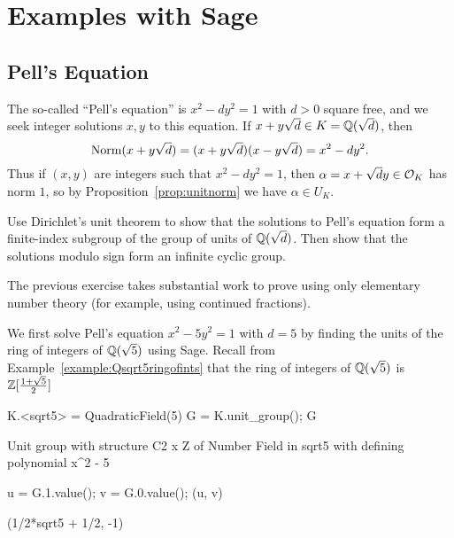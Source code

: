 \section{Examples with Sage}

\subsection{Pell's Equation}\label{sec:pell}

The so-called ``Pell's equation'' is $x^2-dy^2 = 1$ with $d>0$ square
free, and we seek integer solutions $x,y$ to this equation.
If $x+y\sqrt{d}\in K = \mathbb{Q}(\sqrt{d})$, then
$$
	\operatorname{Norm}(x+y\sqrt{d}) = (x+y\sqrt{d})(x-y\sqrt{d}) = x^2 -dy^2.
$$
Thus if $(x,y)$ are integers such that $x^2 - d y^2 = 1$, then $\alpha
= x + \sqrt{d}y \in \mathcal{O}_K$ has norm $1$, so by
Proposition~\ref{prop:unitnorm} we have $\alpha \in U_K$.

\begin{exercise}
	Use Dirichlet's unit theorem to show that the solutions to Pell's equation
	form a finite-index subgroup of the group of units of $\mathbb{Q}(\sqrt{d})$.
	Then show that the solutions modulo sign form an infinite cyclic group.
\end{exercise}

\begin{remark}
	The previous exercise takes substantial work to prove using only elementary
	number theory (for example, using continued fractions).
\end{remark}

We first solve Pell's equation $x^2 - 5y^2 = 1$ with $d=5$ by finding
the units of the ring of integers of $\mathbb{Q}(\sqrt{5})$ using Sage.
Recall from Example~\ref{example:Qsqrt5ringofints} that the
ring of integers of $\mathbb{Q}(\sqrt{5})$ is $\mathbb{Z}[\frac{1+\sqrt{5}}{2}]$

\begin{sagecode}
\begin{sagecell}
K.<sqrt5> = QuadraticField(5)
G = K.unit_group(); G
\end{sagecell}
\begin{sageout}
Unit group with structure C2 x Z of Number Field in sqrt5 with
defining polynomial x^2 - 5
\end{sageout}
\begin{sagecell}
u = G.1.value(); v = G.0.value(); (u, v)
\end{sagecell}
\begin{sageout}
(1/2*sqrt5 + 1/2, -1)
\end{sageout}
\end{sagecode} %

